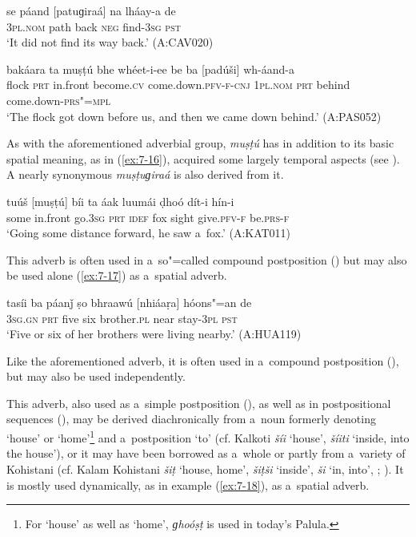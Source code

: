 \begin{exe}
\ex
\label{ex:7-14}
\gll se páand [patuɡiraá] na lháay-a de  \\
\textsc{3pl.nom} path back  \textsc{neg} find-\textsc{3sg} \textsc{pst}\\
\glt `It did not find its way back.' (A:CAV020)

\ex
\label{ex:7-15}
\gll bakáara ta muṣṭú bhe whéet-i-ee  be ba [padúši] wh-áand-a \\
flock \textsc{prt} in.front become.\textsc{cv} come.down.\textsc{pfv-f-cnj} \textsc{1pl.nom} \textsc{prt} behind come.down-\textsc{prs"=mpl}\\
\glt `The flock got down before us, and then we came down behind.' (A:PAS052)
\end{exe}

 As with the aforementioned adverbial group, \textit{muṣṭú} has in addition to its basic spatial meaning, as in (\ref{ex:7-16}), acquired some largely temporal aspects (see ). A nearly synonymous \textit{muṣṭuɡiraá} is also derived from it. 

\begin{exe}
\ex
\label{ex:7-16}
\gll tuúš [muṣṭú] bíi ta áak luumái ḍhoó dít-i hín-i \\
some in.front go.\textsc{3sg} \textsc{prt} \textsc{idef} fox sight give.\textsc{pfv-f} be.\textsc{prs-f}\\
\glt `Going some distance forward, he saw a~fox.' (A:KAT011)
\end{exe}

 This adverb is often used in a~so"=called compound postposition () but may also be used alone (\ref{ex:7-17}) as a~spatial adverb.
\begin{exe}
\ex
\label{ex:7-17}
\gll tasíi ba páanǰ ṣo bhraawú [nhiáaṛa] hóons"=an de \\
\textsc{3sg.gn} \textsc{prt} five six brother.\textsc{pl} near stay-\textsc{3pl} \textsc{pst}\\
\glt `Five or six of her brothers were living nearby.' (A:HUA119)
\end{exe}

 Like the aforementioned adverb, it is often used in a~compound postposition (), but may also be used independently.

 This adverb, also used as a~simple postposition
(), as well as in postpositional sequences (), may be derived diachronically from
a~noun formerly denoting `house' or `home'\footnote{For `house' as well as `home',
  \textit{ɡhoóṣṭ} is used in today's Palula.} and a~postposition `to' (cf. Kalkoti
\textit{šíi} `house', \textit{šíiti} `inside, into the house'), or it may have been borrowed
as a~whole or partly from a~variety of Kohistani (cf. Kalam Kohistani \textit{šiṭ} `house, home',
\textit{šiṭši} `inside', \textit{ši} `in, into', \citealt[119]{baart1997}; \citeyear[76]{baart1999a}). It is mostly used
dynamically, as in example (\ref{ex:7-18}), as a~spatial adverb.

